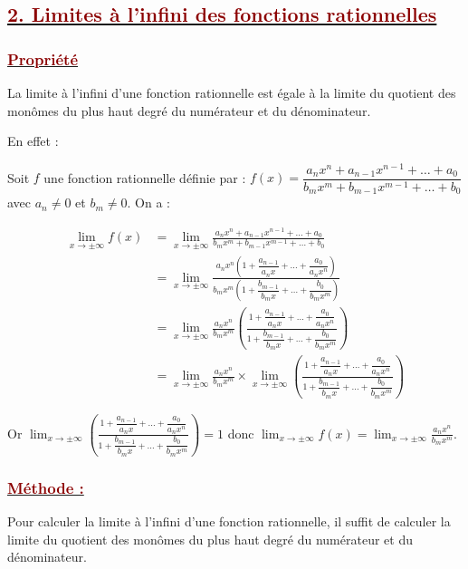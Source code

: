 \documentclass[12pt,a4paper]{article}
\begin{document}
\subsection*{\underline{\textcolor{darkred}{ 2. Limites à l’infini des fonctions rationnelles }}}
\subsubsection*{\underline{\textcolor{darkred}{ Propriété }}}

La limite à l'infini d'une fonction rationnelle est égale à la limite du quotient des monômes du plus haut degré du numérateur et du dénominateur.


\vspace{0.3cm}

\noindent En effet :

\noindent Soit $f$ une fonction rationnelle définie par : $f(x) = \dfrac{a_n x^n + a_{n-1} x^{n-1} + \dots + a_0}{b_m x^m + b_{m-1} x^{m-1} + \dots + b_0}$ avec $a_n \neq 0$ et $b_m \neq 0$. On a :

\begin{align*}
\lim_{x \to \pm\infty} f(x) &= \lim_{x \to \pm\infty} \frac{a_n x^n + a_{n-1} x^{n-1} + \dots + a_0}{b_m x^m + b_{m-1} x^{m-1} + \dots + b_0} \\
&= \lim_{x \to \pm\infty} \frac{a_n x^n \left(1 + \dfrac{a_{n-1}}{a_n x} + \dots + \dfrac{a_0}{a_n x^n}\right)}{b_m x^m \left(1 + \dfrac{b_{m-1}}{b_m x} + \dots + \dfrac{b_0}{b_m x^m}\right)} \\
&= \lim_{x \to \pm\infty} \frac{a_n x^n}{b_m x^m} \left( \frac{1 + \dfrac{a_{n-1}}{a_n x} + \dots + \dfrac{a_0}{a_n x^n}}{1 + \dfrac{b_{m-1}}{b_m x} + \dots + \dfrac{b_0}{b_m x^m}} \right) \\
&= \lim_{x \to \pm\infty} \frac{a_n x^n}{b_m x^m} \times \lim_{x \to \pm\infty} \left( \frac{1 + \dfrac{a_{n-1}}{a_n x} + \dots + \dfrac{a_0}{a_n x^n}}{1 + \dfrac{b_{m-1}}{b_m x} + \dots + \dfrac{b_0}{b_m x^m}} \right)
\end{align*}

\noindent Or $\displaystyle \lim_{x \to \pm\infty} \left( \frac{1 + \dfrac{a_{n-1}}{a_n x} + \dots + \dfrac{a_0}{a_n x^n}}{1 + \dfrac{b_{m-1}}{b_m x} + \dots + \dfrac{b_0}{b_m x^m}} \right) = 1$ donc $\displaystyle \lim_{x \to \pm\infty} f(x) = \lim_{x \to \pm\infty} \frac{a_n x^n}{b_m x^m}$.

\subsubsection*{\underline{\textcolor{darkred}{ Méthode : }}}
Pour calculer la limite à l'infini d'une fonction rationnelle, il suffit de calculer la limite du quotient des monômes du plus haut degré du numérateur et du dénominateur.
\end{document}
